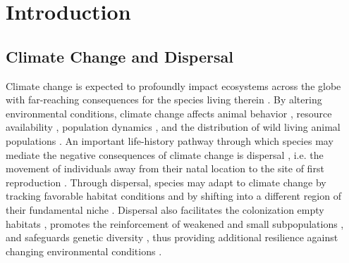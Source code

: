 \documentclass[abstract=on,10pt,a4paper,bibliography=totocnumbered]{article}
\begin{document}
\newpage

\onehalfspacing
\tableofcontents
\doublespacing

\newpage
{}


\section{Introduction}
\subsection{Climate Change and Dispersal}
Climate change is expected to profoundly impact ecosystems across the globe with
far-reaching consequences for the species living therein \citep{Ozgul.2010,
Radchuk.2019, IPCC.2022}. By altering environmental conditions, climate change
affects animal behavior \citep{Fuller.2016}, resource availability
\citep{Durant.2007}, population dynamics \citep{Paniw.2021}, and the
distribution of wild living animal populations \citep{Thomas.2004,
Thuiller.2006}. An important life-history pathway through which species may
mediate the negative consequences of climate change is dispersal
\citep{Anderson.2012}, i.e. the movement of individuals away from their natal
location to the site of first reproduction \citep{Clobert.2012}. Through
dispersal, species may adapt to climate change by tracking favorable habitat
conditions \citep{Raia.2012} and by shifting into a different region of their
fundamental niche \citep{Kokko.2006}. Dispersal also facilitates the
colonization empty habitats \citep{Gustafson.1996, Hanski.1999a,
MacArthur.2001}, promotes the reinforcement of weakened and small subpopulations
\citep{Brown.1977}, and safeguards genetic diversity \citep{Frankham.2002,
Leigh.2012, Baguette.2013}, thus providing additional resilience against
changing environmental conditions \citep{Kokko.2006, Fahrig.2003}.
\end{document}
